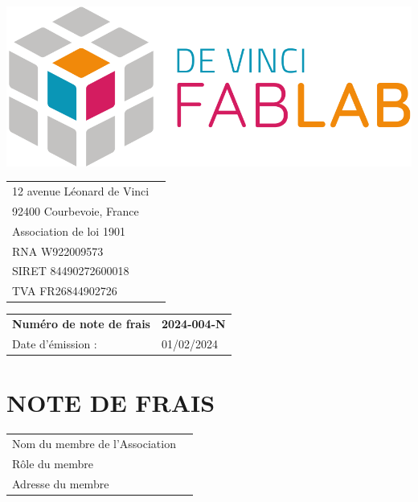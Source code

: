 \documentclass[11pt,a4paper]{article}
\begin{document}
\thispagestyle{empty}


\begin{minipage}{0.4\textwidth}
    \includegraphics[width=0.7\linewidth]{../assets/logo_fablab.png}

    \vspace{0.5cm}

    \begin{tabular}{ll}
        12 avenue Léonard de Vinci \\
        92400 Courbevoie, France   \\
        Association de loi 1901    \\
        RNA W922009573             \\
        SIRET 84490272600018       \\
        TVA  FR26844902726         \\
    \end{tabular}
\end{minipage}\begin{minipage}{0.6\textwidth}
    \begin{flushright}
        \begin{tabular}{ll}
            \textbf{Numéro de note de frais} & \textbf{2024-004-N} \\
            Date d'émission :         & 01/02/2024          \\
        \end{tabular}
    \end{flushright}
\end{minipage}

\begin{minipage}[t]{0.5\textwidth}
    \hspace*{0pt}\vspace*{\fill}
    \section*{\LARGE NOTE DE FRAIS}
\end{minipage}\begin{minipage}[t]{0.5\textwidth}
    \begin{framed}
        \begin{tabular}{ll}
            Nom du membre de l'Association \\
            Rôle du membre                 \\
            Adresse du membre              \\
        \end{tabular}
    \end{framed}
    \vspace{0.1cm}
\end{minipage}
\end{document}
